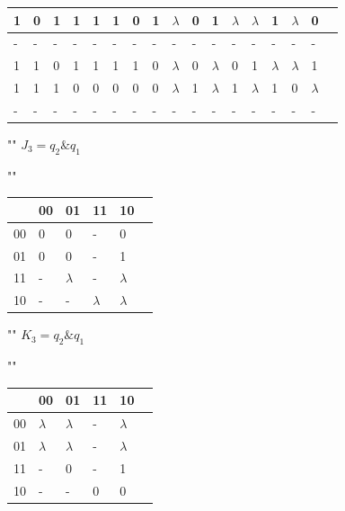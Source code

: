 \documentclass[a4paper,12pt]{article}
\begin{document}
\begin{center}
\begin{tabular}{ | l | l | l | l | l | l | l | l | l | l | l | l | l | l | l | l | p{1cm} |}
	 	1 & 0 & 1 & 1 & 1 & 1 & 0 & 1 & $\lambda$ & 0 & 1 & $\lambda$ & $\lambda$ & 1 & $\lambda$ & 0 \\\hline
	 	- & - & - & - & - & - & - & - & - & - & - & - & - & - & - & - \\\hline
	 	1 & 1 & 0 & 1 & 1 & 1 & 1 & 0 & $\lambda$ & 0 & $\lambda$ & 0 & 1 & $\lambda$ & $\lambda$ & 1 \\\hline
	 	1 & 1 & 1 & 0 & 0 & 0 & 0 & 0 & $\lambda$ & 1 & $\lambda$ & 1 & $\lambda$ & 1 & 0 & $\lambda$ \\\hline
	 	- & - & - & - & - & - & - & - & - & - & - & - & - & - & - & - \\
		\hline
	\end{tabular}

	""\newline
	$J_{3} = q_{2} \& q_{1}$
	
	""\newline
	\begin{tabular}{ | l | l | l | l | l | p{1cm} |}
		\hline
		\diagbox[width=5em]{$q_{3}q_{2}$}{$q_{1}q_{0}$} & 00 & 01 & 11 & 10 \\\hline
		00 & 0 & 0 & - & 0 \\\hline
		01 & 0 & 0 & \cellcolor{blue!25} - & \cellcolor{blue!25} 1 \\ \hline
		11 & - & $\lambda$ & \cellcolor{blue!25} - &  \cellcolor{blue!25} $\lambda$ \\ \hline
		10 & - & - & $\lambda$ & $\lambda$ \\ 
		\hline
	\end{tabular}

	""\newline\newline
	$K_{3} = q_{2} \& q_{1}$
	
	""\newline
	\begin{tabular}{ | l | l | l | l | l | p{1cm} |}
		\hline
		\diagbox[width=5em]{$q_{3}q_{2}$}{$q_{1}q_{0}$} & 00 & 01 & 11 & 10 \\\hline
		00 & $\lambda$ & $\lambda$ & - & $\lambda$ \\\hline
		01 & $\lambda$ & $\lambda$ & \cellcolor{blue!25} - & \cellcolor{blue!25} $\lambda$ \\ \hline
		11 & - & 0 & \cellcolor{blue!25} - &  \cellcolor{blue!25} 1  \\ \hline
		10 & - & - & 0 & 0 \\ 
		\hline
	\end{tabular}


\end{center}
\end{document}
